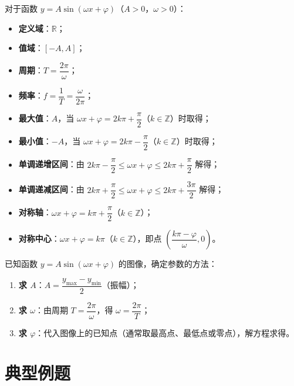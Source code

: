 \documentclass[11pt]{ctexrep}
\begin{document}
\begin{property}[正弦型函数的基本性质]
    对于函数 $y = A\sin(\omega x + \varphi)$（$A > 0$，$\omega > 0$）：
    \begin{itemize}
        \item \textbf{定义域}：$\mathbb{R}$；
        \item \textbf{值域}：$[-A, A]$；
        \item \textbf{周期}：$T = \dfrac{2\pi}{\omega}$；
        \item \textbf{频率}：$f = \dfrac{1}{T} = \dfrac{\omega}{2\pi}$；
        \item \textbf{最大值}：$A$，当 $\omega x + \varphi = 2k\pi + \dfrac{\pi}{2}$（$k \in \mathbb{Z}$）时取得；
        \item \textbf{最小值}：$-A$，当 $\omega x + \varphi = 2k\pi - \dfrac{\pi}{2}$（$k \in \mathbb{Z}$）时取得；
        \item \textbf{单调递增区间}：由 $2k\pi - \dfrac{\pi}{2} \leqslant \omega x + \varphi \leqslant 2k\pi + \dfrac{\pi}{2}$ 解得；
        \item \textbf{单调递减区间}：由 $2k\pi + \dfrac{\pi}{2} \leqslant \omega x + \varphi \leqslant 2k\pi + \dfrac{3\pi}{2}$ 解得；
        \item \textbf{对称轴}：$\omega x + \varphi = k\pi + \dfrac{\pi}{2}$（$k \in \mathbb{Z}$）；
        \item \textbf{对称中心}：$\omega x + \varphi = k\pi$（$k \in \mathbb{Z}$），即点 $\left(\dfrac{k\pi - \varphi}{\omega}, 0\right)$。
    \end{itemize}
\end{property}

\begin{property}[由图像确定函数解析式]
    已知函数 $y = A\sin(\omega x + \varphi)$ 的图像，确定参数的方法：
    \begin{enumerate}
        \item \textbf{求 $A$}：$A = \dfrac{y_{\max} - y_{\min}}{2}$（振幅）；
        \item \textbf{求 $\omega$}：由周期 $T = \dfrac{2\pi}{\omega}$，得 $\omega = \dfrac{2\pi}{T}$；
        \item \textbf{求 $\varphi$}：代入图像上的已知点（通常取最高点、最低点或零点），解方程求得。
    \end{enumerate}
\end{property}

\section*{典型例题}
\end{document}
